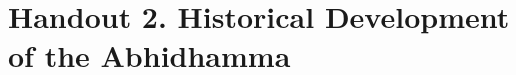 \documentclass[a4 paper, 12pt]{article}
\begin{document}
\pagestyle{empty}

\makeatletter
{}
\makeatother

\graphicspath{{../}}

\section*{Handout 2. Historical Development of the Abhidhamma}

\vspace{5mm}

\centering

\end{document}
